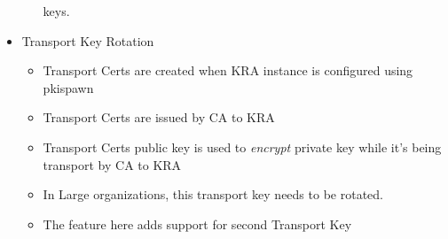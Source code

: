 \documentclass[12pt]{report}
\begin{document}
\begin{itemize}
\begin{itemize}
                keys.
        \end{itemize}
    \item Transport Key Rotation
        \begin{itemize}
            \item Transport Certs are created when KRA instance is configured using pkispawn
            \item Transport Certs are issued by CA to KRA
            \item Transport Certs public key is used to \textit{encrypt} private key while it's being
                transport by CA to KRA 
            \item In Large organizations, this transport key needs to be rotated. 
            \item The feature here adds support for second Transport Key 
        \end{itemize}
\end{itemize}
\end{document}
